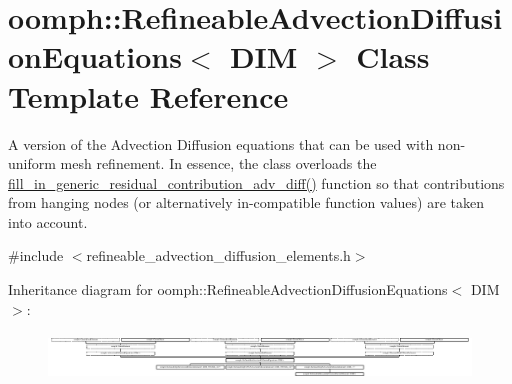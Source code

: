 \hypertarget{classoomph_1_1RefineableAdvectionDiffusionEquations}{}\section{oomph\+:\+:Refineable\+Advection\+Diffusion\+Equations$<$ D\+IM $>$ Class Template Reference}
\label{classoomph_1_1RefineableAdvectionDiffusionEquations}


A version of the Advection Diffusion equations that can be used with non-\/uniform mesh refinement. In essence, the class overloads the \hyperlink{classoomph_1_1RefineableAdvectionDiffusionEquations_aa42c5000c45380b8370565fac3990320}{fill\+\_\+in\+\_\+generic\+\_\+residual\+\_\+contribution\+\_\+adv\+\_\+diff()} function so that contributions from hanging nodes (or alternatively in-\/compatible function values) are taken into account.  




{\ttfamily \#include $<$refineable\+\_\+advection\+\_\+diffusion\+\_\+elements.\+h$>$}

Inheritance diagram for oomph\+:\+:Refineable\+Advection\+Diffusion\+Equations$<$ D\+IM $>$\+:\begin{figure}[H]
\begin{center}
\leavevmode
\includegraphics[height=1.269841cm]{classoomph_1_1RefineableAdvectionDiffusionEquations}
\end{center}
\end{figure}
